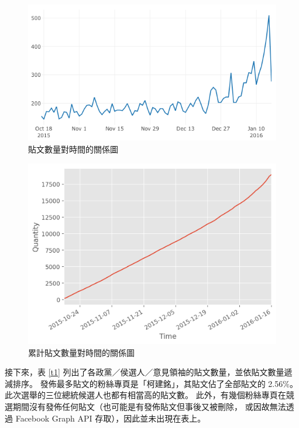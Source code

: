 \documentclass[a4paper, 10pt, conference]{ieeeconf}       %
\begin{document}
\begin{CJK}{UTF8}{bsmi}
\begin{figure}[!htbp]
\centering
\includegraphics[width=\columnwidth]{quantity_time_graph_ng}
\caption{貼文數量對時間的關係圖}
\label{f1}
\end{figure}

\begin{figure}[!htbp]
\centering
\includegraphics[width=\columnwidth]{quantity_time_cumulative_graph}
\caption{累計貼文數量對時間的關係圖}
\label{f2}
\end{figure}

接下來，表 \ref{t1} 列出了各政黨／侯選人／意見領袖的貼文數量，並依貼文數量遞減排序。%
發佈最多貼文的粉絲專頁是「柯建銘」，其貼文佔了全部貼文的 2.56\%。%
此次選舉的三位總統候選人也都有相當高的貼文數。%
此外，有幾個粉絲專頁在競選期間沒有發佈任何貼文（也可能是有發佈貼文但事後又被刪除，%
或因故無法透過 Facebook Graph API 存取），因此並未出現在表上。%

\onecolumn


\end{CJK}
\end{document}
